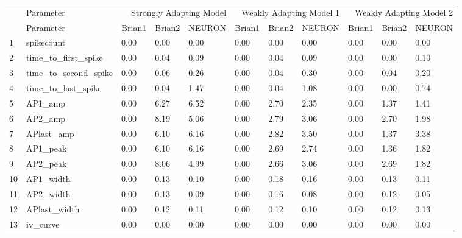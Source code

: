 \begin{tabular}{lllllllllll}
 & Parameter & \multicolumn{3}{r}{Strongly Adapting Model} & \multicolumn{3}{r}{Weakly Adapting Model 1} & \multicolumn{3}{r}{Weakly Adapting Model 2} \\
 & Parameter & Brian1 & Brian2 & NEURON & Brian1 & Brian2 & NEURON & Brian1 & Brian2 & NEURON \\
1 & spikecount & 0.00 & 0.00 & 0.00 & 0.00 & 0.00 & 0.00 & 0.00 & 0.00 & 0.00 \\
2 & time_to_first_spike & 0.00 & 0.04 & 0.09 & 0.00 & 0.04 & 0.09 & 0.00 & 0.00 & 0.10 \\
3 & time_to_second_spike & 0.00 & 0.06 & 0.26 & 0.00 & 0.04 & 0.30 & 0.00 & 0.04 & 0.20 \\
4 & time_to_last_spike & 0.00 & 0.04 & 1.47 & 0.00 & 0.04 & 1.08 & 0.00 & 0.00 & 0.74 \\
5 & AP1_amp & 0.00 & 6.27 & 6.52 & 0.00 & 2.70 & 2.35 & 0.00 & 1.37 & 1.41 \\
6 & AP2_amp & 0.00 & 8.19 & 5.06 & 0.00 & 2.79 & 3.06 & 0.00 & 2.70 & 1.98 \\
7 & APlast_amp & 0.00 & 6.10 & 6.16 & 0.00 & 2.82 & 3.50 & 0.00 & 1.37 & 3.38 \\
8 & AP1_peak & 0.00 & 6.10 & 6.16 & 0.00 & 2.69 & 2.74 & 0.00 & 1.36 & 1.82 \\
9 & AP2_peak & 0.00 & 8.06 & 4.99 & 0.00 & 2.66 & 3.06 & 0.00 & 2.69 & 1.82 \\
10 & AP1_width & 0.00 & 0.13 & 0.10 & 0.00 & 0.18 & 0.16 & 0.00 & 0.13 & 0.11 \\
11 & AP2_width & 0.00 & 0.13 & 0.09 & 0.00 & 0.16 & 0.08 & 0.00 & 0.12 & 0.05 \\
12 & APlast_width & 0.00 & 0.12 & 0.11 & 0.00 & 0.12 & 0.10 & 0.00 & 0.12 & 0.13 \\
13 & iv_curve & 0.00 & 0.00 & 0.00 & 0.00 & 0.00 & 0.00 & 0.00 & 0.00 & 0.00 \\
\end{tabular}
